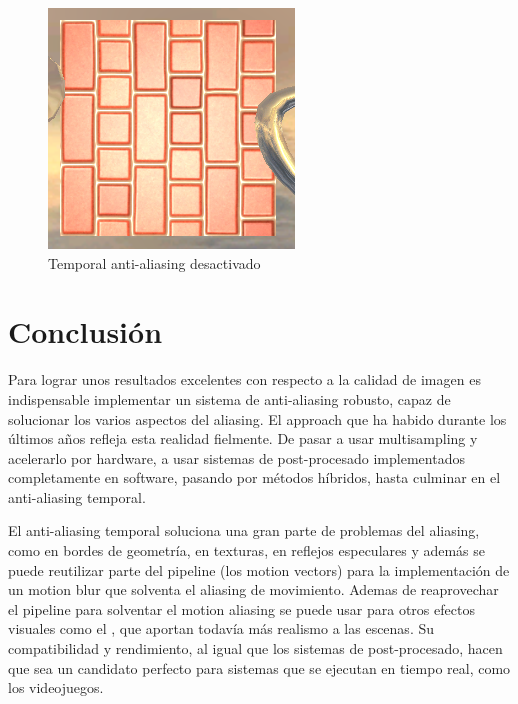 \documentclass[withindex, glossary]{cam-thesis}
\begin{document}
\begin{figure}[!htbp]
    \includegraphics[width=.8\linewidth]{figures/sharpTAAOFFsmall.png}
    \caption{Temporal anti-aliasing desactivado\label{sharpTAAOFFsmall}}
\end{figure}

\chapter{Conclusión}

Para lograr unos resultados excelentes con respecto a la calidad de imagen es indispensable implementar un sistema de anti-aliasing robusto, capaz de solucionar los varios aspectos del aliasing. El approach que ha habido durante los últimos años refleja esta realidad fielmente. De pasar a usar multisampling y acelerarlo por hardware, a usar sistemas de post-procesado implementados completamente en software, pasando por métodos híbridos, hasta culminar en el anti-aliasing temporal.

El anti-aliasing temporal soluciona una gran parte de problemas del aliasing, como en bordes de geometría, en texturas, en reflejos especulares y además se puede reutilizar parte del pipeline (los motion vectors) para la implementación de un motion blur que solventa el aliasing de movimiento. Ademas de reaprovechar el pipeline para solventar el motion aliasing se puede usar para otros efectos visuales como el , que aportan todavía más realismo a las escenas. Su compatibilidad y rendimiento, al igual que los sistemas de post-procesado, hacen que sea un candidato perfecto para sistemas que se ejecutan en tiempo real, como los videojuegos.
\end{document}
